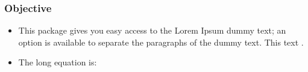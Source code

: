 \documentclass[9pt]{beamer}
\begin{document}
\begin{frame} \frametitle{\textbf{{\Large Objective}}}
    \begin{itemize}
        \justifying
            \item This package gives you easy access to the Lorem Ipsum dummy text; an option is available to separate the paragraphs of the dummy text. This text \cite{kumar2015method}.
        
        \item The long equation is:                        
    \end{itemize}
\end{frame}

\begin{frame}


\end{frame}
\end{document}
